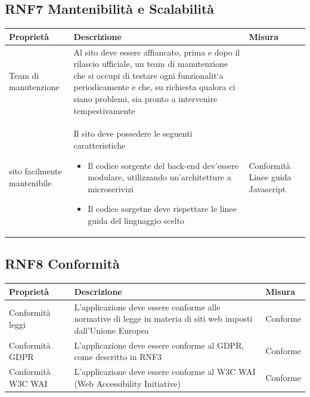 \documentclass{report}
\begin{document}
\subsection*{RNF7 Mantenibilità e Scalabilità}
\begin{center} %
	\centering
	\begin{tabular}{ |p{3cm}|p{4cm}|p{4cm}|  }
		\hline
		\centering Proprietà & \qquad\quad Descrizione & \qquad\qquad Misura\\ %
		\hline
		Team di manutenzione &  Al sito deve essere affiancato, prima e dopo il rilascio ufficiale, un team di
		manutenzione che si occupi di testare ogni funzionalit`a periodicamente e
		che, su richiesta qualora ci siano problemi, sia pronto a intervenire tempestivamente
		 & \\
		\hline
		sito facilmente mantenibile & Il sito deve possedere le seguenti caratteristiche
		\begin{itemize}
			\item Il codice sorgente del back-end dev'essere modulare, utilizzando un'architetture a microserivizi
			\item Il codice sorgetne deve rispettare le linee guida del linguaggio scelto
		\end{itemize}
		& Conformità Linee guida Javascript
		\\  \hline

	\end{tabular}
\end{center}
\subsection*{RNF8 Conformità}
\begin{center} %
	\centering
	\begin{tabular}{ |p{3cm}|p{4cm}|p{4cm}|  }
		\hline
		\centering Proprietà & \qquad\quad Descrizione & \qquad\qquad Misura\\ %
		\hline
		Conformità leggi & L'applicazione deve essere conforme alle normative di legge in materia di siti web imposti dall'Unione Europea & Conforme \\
		\hline
		Conformità GDPR & L'applicazione deve essere conforme al GDPR, come descritto in RNF3 & Conforme \\
		\hline
		Conformità W3C WAI & L'applicazione deve essere conforme al W3C WAI (Web Accessibility Initiative) & Conforme \\ 
		\hline
	\end{tabular}

\end{center}
\end{document}
